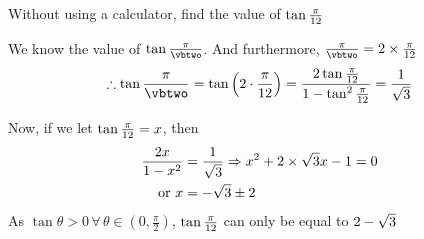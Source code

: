 


\DIVIDE{}\vbtwo

\question[3] Without using a calculator, find the value of $\tan\frac{\pi}{12}$

\watchout
{}

\ifprintanswers
\fi 

\begin{solution}[\halfpage]
  We know the value of $\tan\frac\pi\vbtwo$. And furthermore, $\frac\pi\vbtwo = 2\times\frac\pi\vbone$
	\begin{align}
		\therefore\tan\frac{\pi}{\vbtwo} = \tan \left(2\cdot\frac{\pi}{\vbone}\right) &= \frac{2\tan\frac{\pi}{\vbone}}{1-\tan^2\frac{\pi}{\vbone}} = \vbthree \\
  \end{align}

  Now, if we let $\tan\frac\pi{12} = x$, then 
  \begin{align}
    \dfrac{2x}{1-x^2} &= \dfrac{1}{\sqrt{3}} \Rightarrow
		x^2 + 2\times\sqrt{3} x - 1 = 0 \\
    \text{ or } x &= -\sqrt{3} \pm 2 
	\end{align}
	As $\tan\theta > 0 \,\forall \,\theta \in (0,\frac{\pi}{2})$, $\tan\frac\pi{12}$ can only be equal to
	$2 - \sqrt{3}$
\end{solution}

